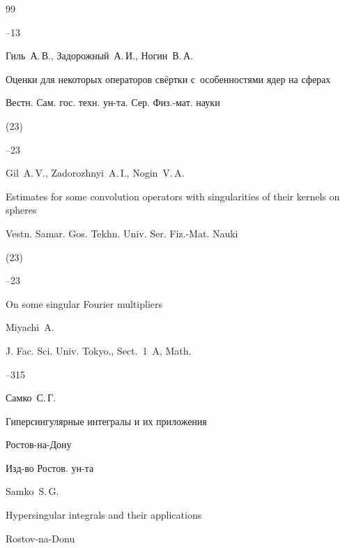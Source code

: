 \begin{thebibliography}{99}


–13




\by Гиль~А.\,В., Задорожный~А.\,И., Ногин~В.\,А. 

\paper Оценки для некоторых операторов свёртки с~особенностями ядер на сферах 

\jour  Вестн. Сам. гос. техн. ун-та. Сер. Физ.-мат. науки


(23)

--23

\misctransl

\by Gil~A.\,V., Zadorozhnyi~A.\,I., Nogin~V.\,A.

\paper Estimates for some convolution operators with singularities of their kernels on spheres

\jour Vestn. Samar. Gos. Tekhn. Univ. Ser. Fiz.-Mat. Nauki


(23)

--23




\paper  On some singular Fourier multipliers

\by Miyachi~A. 

\jour J. Fac. Sci. Univ. Tokyo., Sect.~1~A, Math. 




--315








\by Самко~С.\,Г. 

\book Гиперсингулярные интегралы и их приложения 

\publaddr  Ростов-на-Дону 

\publ Изд-во Ростов. ун-та 



\misctransl

\by Samko~S.\,G.

\book Hypersingular integrals and their applications

\publaddr Rostov-na-Donu


\end{thebibliography}
